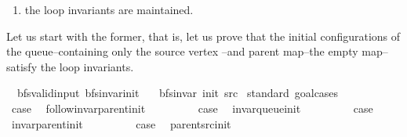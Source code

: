 \begin{isabellebody}
\begin{isamarkuptext}
\begin{enumerate}
\item the loop invariants are maintained.%
\end{enumerate}


Let us start with the former, that is, let us prove that the initial configurations of the
queue--containing only the source vertex --and parent map--the empty map--satisfy the
loop invariants.%
\end{isamarkuptext}\isamarkuptrue%
\isamarkupfalse%
\ {\isacharparenleft}{\kern0pt}\ bfs{\isacharunderscore}{\kern0pt}valid{\isacharunderscore}{\kern0pt}input{\isacharparenright}{\kern0pt}\ bfs{\isacharunderscore}{\kern0pt}invar{\isacharunderscore}{\kern0pt}init{\isacharcolon}{\kern0pt}\isanewline
\ \ \ {\isachardoublequoteopen}bfs{\isacharunderscore}{\kern0pt}invar{\isacharprime}{\kern0pt}{\isacharprime}{\kern0pt}\ {\isacharparenleft}{\kern0pt}init\ src{\isacharparenright}{\kern0pt}{\isachardoublequoteclose}\isanewline
%
\isadelimproof
%
\endisadelimproof
%
\isatagproof
{}\isamarkupfalse%
\ {\isacharparenleft}{\kern0pt}standard{\isacharcomma}{\kern0pt}\ goal{\isacharunderscore}{\kern0pt}cases{\isacharparenright}{\kern0pt}\isanewline
\ \ \isamarkupfalse%
\ {}\isanewline
\ \ \isamarkupfalse%
\ {\isacharquery}{\kern0pt}case\ \isamarkupfalse%
\ follow{\isacharunderscore}{\kern0pt}invar{\isacharunderscore}{\kern0pt}parent{\isacharunderscore}{\kern0pt}init\ \isacommand{{\isachardot}{\kern0pt}}\isamarkupfalse%
\isanewline
{}\isamarkupfalse%
\isanewline
\ \ \isamarkupfalse%
\ {}\isanewline
\ \ \isamarkupfalse%
\ {\isacharquery}{\kern0pt}case\ \isamarkupfalse%
\ invar{\isacharunderscore}{\kern0pt}queue{\isacharunderscore}{\kern0pt}init\ \isacommand{{\isachardot}{\kern0pt}}\isamarkupfalse%
\isanewline
{}\isamarkupfalse%
\isanewline
\ \ \isamarkupfalse%
\ {}\isanewline
\ \ \isamarkupfalse%
\ {\isacharquery}{\kern0pt}case\ \isamarkupfalse%
\ invar{\isacharunderscore}{\kern0pt}parent{\isacharunderscore}{\kern0pt}init\ \isacommand{{\isachardot}{\kern0pt}}\isamarkupfalse%
\isanewline
{}\isamarkupfalse%
\isanewline
\ \ \isamarkupfalse%
\ {}\isanewline
\ \ \isamarkupfalse%
\ {\isacharquery}{\kern0pt}case\ \isamarkupfalse%
\ parent{\isacharunderscore}{\kern0pt}src{\isacharunderscore}{\kern0pt}init\ \isacommand{{\isachardot}{\kern0pt}}\isamarkupfalse%

\end{isabellebody}
